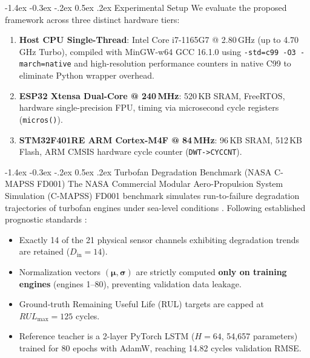 \documentclass[10pt,twocolumn,a4paper]{article}
\makeatletter
\renewcommand\subsection{\@startsection{subsection}{2}{\z@}%
  {-1.4ex \@plus -0.3ex \@minus -.2ex}%
  {0.5ex \@plus .2ex}%
  {\normalfont\normalsize\bfseries}}
\theoremstyle{plain}
\theoremstyle{definition}
\makeatother
\begin{document}
\subsection{Experimental Setup}
We evaluate the proposed framework across three distinct hardware tiers:
\begin{enumerate}
    \item \textbf{Host CPU Single-Thread}: Intel Core i7-1165G7 @ 2.80\,GHz (up to 4.70\,GHz Turbo), compiled with MinGW-w64 GCC 16.1.0 using \texttt{-std=c99 -O3 -march=native} and high-resolution performance counters in native C99 to eliminate Python wrapper overhead.
    \item \textbf{ESP32 Xtensa Dual-Core @ 240\,MHz}: 520\,KB SRAM, FreeRTOS, hardware single-precision FPU, timing via microsecond cycle registers (\texttt{micros()}).
    \item \textbf{STM32F401RE ARM Cortex-M4F @ 84\,MHz}: 96\,KB SRAM, 512\,KB Flash, ARM CMSIS hardware cycle counter (\texttt{DWT->CYCCNT}).
\end{enumerate}

\subsection{Turbofan Degradation Benchmark (NASA C-MAPSS FD001)}
The NASA Commercial Modular Aero-Propulsion System Simulation (C-MAPSS) FD001 benchmark simulates run-to-failure degradation trajectories of turbofan engines under sea-level conditions \cite{saxena2008damage}. Following established prognostic standards \cite{zheng2017long, li2018remaining}:
\begin{itemize}
    \item Exactly 14 of the 21 physical sensor channels exhibiting degradation trends are retained ($D_{\mathrm{in}} = 14$).
    \item Normalization vectors $(\boldsymbol{\mu}, \boldsymbol{\sigma})$ are strictly computed \textbf{only on training engines} (engines 1--80), preventing validation data leakage.
    \item Ground-truth Remaining Useful Life (RUL) targets are capped at $RUL_{\mathrm{max}} = 125$ cycles.
    \item Reference teacher is a 2-layer PyTorch LSTM ($H=64$, 54,657 parameters) trained for 80 epochs with AdamW, reaching 14.82 cycles validation RMSE.
\end{itemize}
\end{document}

